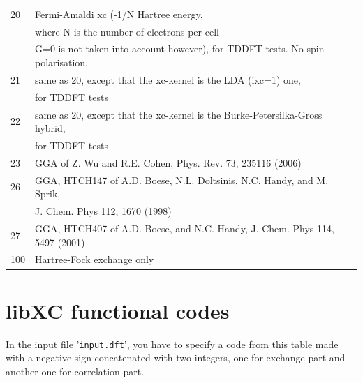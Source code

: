\documentclass[a4paper,11pt]{report}
\begin{document}
\begin{longtable}{ll}
20  & Fermi-Amaldi xc (-1/N Hartree energy, \\
    & where N is the number of electrons per cell\\
    & G=0 is not taken into account however), for TDDFT tests. No spin-polarisation.\\
21  & same as 20, except that the xc-kernel is the LDA (ixc=1) one,\\
    & for TDDFT tests\\
22  & same as 20, except that the xc-kernel is the Burke-Petersilka-Gross hybrid,\\
    & for TDDFT tests\\
23  & GGA of Z. Wu and R.E. Cohen, Phys. Rev. 73, 235116 (2006)\\
26  & GGA, HTCH147 of A.D. Boese, N.L. Doltsinis, N.C. Handy, and M. Sprik,\\
    & J. Chem. Phys 112, 1670 (1998)\\
27  & GGA, HTCH407 of A.D. Boese, and N.C. Handy, J. Chem. Phys 114, 5497 (2001)\\
100 & Hartree-Fock exchange only
\end{longtable}

\section{libXC functional codes}
\label{appendix-libXC}

In the input file '\texttt{input.dft}', you have to specify a code from this table made with a negative sign
concatenated with two integers, one for exchange part and another one for correlation part.
\end{document}
